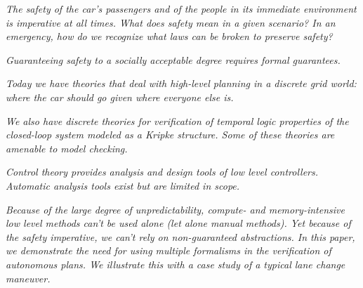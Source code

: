 {\it The safety of the car's passengers and of the people in its immediate environment is imperative at all times. 
	What does safety mean in a given scenario?
	In an emergency, how do we recognize what laws can be broken to preserve safety?}


{\it Guaranteeing safety to a socially acceptable degree requires formal guarantees.}

{\it Today we have theories that deal with high-level planning in a discrete grid world: where the car should go given where everyone else is.}

{\it We also have discrete theories for verification of temporal logic properties of the closed-loop system modeled as a Kripke structure. Some of these theories are amenable to model checking.}

{\it Control theory provides analysis and design tools of low level controllers. Automatic analysis tools exist but are limited in scope.}

{\it Because of the large degree of unpredictability, compute- and memory-intensive low level methods can't be used alone (let alone manual methods). Yet because of the safety imperative, we can't rely on non-guaranteed abstractions.  In this paper, we demonstrate the need for using multiple formalisms in the verification of autonomous plans. We illustrate this with a case study of a typical lane change maneuver.}

